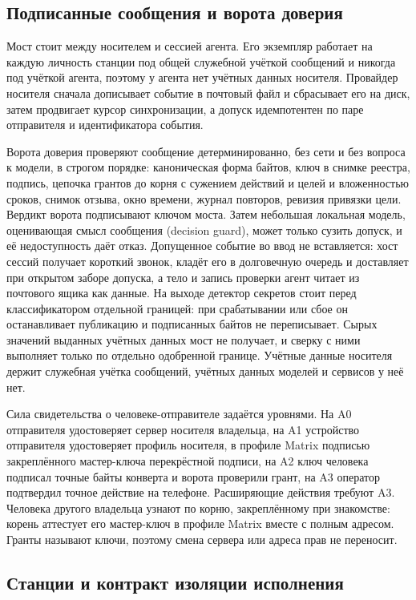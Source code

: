 \documentclass[10pt,a4paper]{article}
\begin{document}
\subsection{Подписанные сообщения и ворота доверия}
\label{sec:bridge}

Мост стоит между носителем и сессией агента. Его экземпляр работает на каждую личность станции под общей служебной учёткой сообщений и никогда под учёткой агента, поэтому у агента нет учётных данных носителя. Провайдер носителя сначала дописывает событие в почтовый файл и сбрасывает его на диск, затем продвигает курсор синхронизации, а допуск идемпотентен по паре отправителя и идентификатора события.

Ворота доверия проверяют сообщение детерминированно, без сети и без вопроса к модели, в строгом порядке: каноническая форма байтов, ключ в снимке реестра, подпись, цепочка грантов до корня с сужением действий и целей и вложенностью сроков, снимок отзыва, окно времени, журнал повторов, ревизия привязки цели. Вердикт ворота подписывают ключом моста. Затем небольшая локальная модель, оценивающая смысл сообщения (decision guard), может только сузить допуск, и её недоступность даёт отказ. Допущенное событие во ввод не вставляется: хост сессий получает короткий звонок, кладёт его в долговечную очередь и доставляет при открытом заборе допуска, а тело и запись проверки агент читает из почтового ящика как данные. На выходе детектор секретов стоит перед классификатором отдельной границей: при срабатывании или сбое он останавливает публикацию и подписанных байтов не переписывает. Сырых значений выданных учётных данных мост не получает, и сверку с ними выполняет только по отдельно одобренной границе. Учётные данные носителя держит служебная учётка сообщений, учётных данных моделей и сервисов у неё нет.

Сила свидетельства о человеке-отправителе задаётся уровнями. На A0 отправителя удостоверяет сервер носителя владельца, на A1 устройство отправителя удостоверяет профиль носителя, в профиле Matrix подписью закреплённого мастер-ключа перекрёстной подписи, на A2 ключ человека подписал точные байты конверта и ворота проверили грант, на A3 оператор подтвердил точное действие на телефоне. Расширяющие действия требуют A3. Человека другого владельца узнают по корню, закреплённому при знакомстве: корень аттестует его мастер-ключ в профиле Matrix вместе с полным адресом. Гранты называют ключи, поэтому смена сервера или адреса прав не переносит.

\subsection{Станции и контракт изоляции исполнения}
\label{sec:station}
\end{document}
